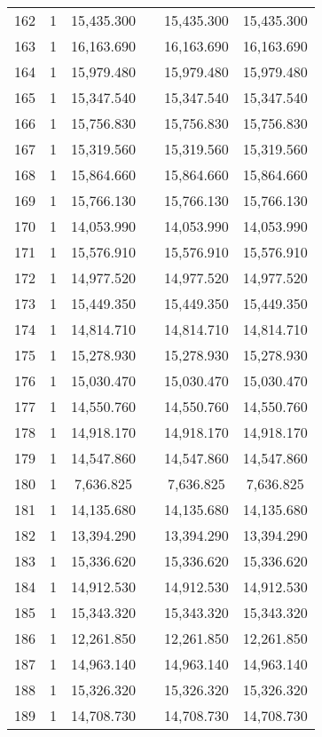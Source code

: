 \begin{table}[!htbp]
\begin{tabular}{@{\extracolsep{5pt}}lccccc}
162 & 1 & 15,435.300 &  & 15,435.300 & 15,435.300 \\ 
163 & 1 & 16,163.690 &  & 16,163.690 & 16,163.690 \\ 
164 & 1 & 15,979.480 &  & 15,979.480 & 15,979.480 \\ 
165 & 1 & 15,347.540 &  & 15,347.540 & 15,347.540 \\ 
166 & 1 & 15,756.830 &  & 15,756.830 & 15,756.830 \\ 
167 & 1 & 15,319.560 &  & 15,319.560 & 15,319.560 \\ 
168 & 1 & 15,864.660 &  & 15,864.660 & 15,864.660 \\ 
169 & 1 & 15,766.130 &  & 15,766.130 & 15,766.130 \\ 
170 & 1 & 14,053.990 &  & 14,053.990 & 14,053.990 \\ 
171 & 1 & 15,576.910 &  & 15,576.910 & 15,576.910 \\ 
172 & 1 & 14,977.520 &  & 14,977.520 & 14,977.520 \\ 
173 & 1 & 15,449.350 &  & 15,449.350 & 15,449.350 \\ 
174 & 1 & 14,814.710 &  & 14,814.710 & 14,814.710 \\ 
175 & 1 & 15,278.930 &  & 15,278.930 & 15,278.930 \\ 
176 & 1 & 15,030.470 &  & 15,030.470 & 15,030.470 \\ 
177 & 1 & 14,550.760 &  & 14,550.760 & 14,550.760 \\ 
178 & 1 & 14,918.170 &  & 14,918.170 & 14,918.170 \\ 
179 & 1 & 14,547.860 &  & 14,547.860 & 14,547.860 \\ 
180 & 1 & 7,636.825 &  & 7,636.825 & 7,636.825 \\ 
181 & 1 & 14,135.680 &  & 14,135.680 & 14,135.680 \\ 
182 & 1 & 13,394.290 &  & 13,394.290 & 13,394.290 \\ 
183 & 1 & 15,336.620 &  & 15,336.620 & 15,336.620 \\ 
184 & 1 & 14,912.530 &  & 14,912.530 & 14,912.530 \\ 
185 & 1 & 15,343.320 &  & 15,343.320 & 15,343.320 \\ 
186 & 1 & 12,261.850 &  & 12,261.850 & 12,261.850 \\ 
187 & 1 & 14,963.140 &  & 14,963.140 & 14,963.140 \\ 
188 & 1 & 15,326.320 &  & 15,326.320 & 15,326.320 \\ 
189 & 1 & 14,708.730 &  & 14,708.730 & 14,708.730 \\ 

\end{tabular}
\end{table}
